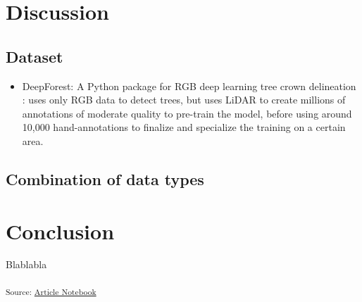 \documentclass[
]{report}
\providecommand{\tightlist}{%
  \setlength{\itemsep}{0pt}\setlength{\parskip}{0pt}}\usepackage{longtable,booktabs,array}
\begin{document}
\chapter{Discussion}\label{discussion}

\section{Dataset}\label{dataset}

\begin{itemize}
\tightlist
\item
  DeepForest: A Python package for RGB deep learning tree crown
  delineation \autocite{DeepForest}: uses only RGB data to detect trees,
  but uses LiDAR to create millions of annotations of moderate quality
  to pre-train the model, before using around 10,000 hand-annotations to
  finalize and specialize the training on a certain area.
\end{itemize}

\section{Combination of data types}\label{combination-of-data-types}

\chapter*{Conclusion}\label{conclusion}

Blablabla

\textsubscript{Source:
\href{https://ZokszY.github.io/Geodan-internship-report/index-preview.html}{Article
Notebook}}


\printbibliography[title=Bibliography]
\end{document}
